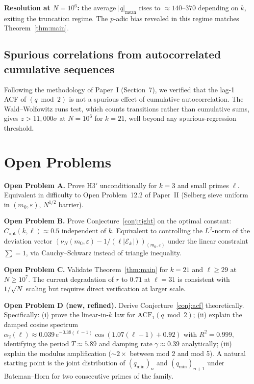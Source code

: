 \documentclass[11pt,a4paper]{article}
\theoremstyle{plain}
\theoremstyle{definition}
\newcommand{\qmin}{q_{\min}}
\newcommand{\eps}{\varepsilon}
\newcommand{\Eclass}{\mathcal{E}}
\begin{document}
\textbf{Resolution at $N = 10^6$:} the average $|q|_{\mathrm{mean}}$ rises to
$\approx 140$--$370$ depending on $k$, exiting the truncation regime. The
$p$-adic bias revealed in this regime matches Theorem~\ref{thm:main}.

\subsection{Spurious correlations from autocorrelated cumulative sequences}

Following the methodology of Paper~I (Section~7), we verified that the lag-1
ACF of $(q \bmod 2)$ is not a spurious effect of cumulative autocorrelation.
The Wald--Wolfowitz runs test, which counts transitions rather than cumulative
sums, gives $z > 11{,}000\sigma$ at $N = 10^6$ for $k = 21$, well beyond any
spurious-regression threshold.

\section{Open Problems}
\label{sec:openpb}

\begin{openproblem}
\textbf{Open Problem A.} Prove H3$'$ unconditionally for $k = 3$ and small primes
$\ell$. Equivalent in difficulty to Open Problem~12.2 of Paper~II
(Selberg sieve uniform in $(m_0, \eps)$, $N^{1/2}$ barrier).
\end{openproblem}

\begin{openproblem}
\textbf{Open Problem B.} Prove Conjecture~\ref{conj:tight} on the optimal
constant: $C_{\mathrm{opt}}(k, \ell) \approx 0.5$ independent of $k$. Equivalent
to controlling the $L^2$-norm of the deviation vector
$(\nu_N(m_0, \eps) - 1/(\ell |\Eclass_k|))_{(m_0, \eps)}$ under the linear
constraint $\sum = 1$, via Cauchy--Schwarz instead of triangle inequality.
\end{openproblem}

\begin{openproblem}
\textbf{Open Problem C.} Validate Theorem~\ref{thm:main} for $k = 21$ and
$\ell \ge 29$ at $N \ge 10^7$. The current degradation of $r$ to $0.71$ at
$\ell = 31$ is consistent with $1/\sqrt{N}$ scaling but requires direct
verification at larger scale.
\end{openproblem}

\begin{openproblem}
\textbf{Open Problem D (new, refined).} Derive Conjecture~\ref{conj:acf}
theoretically. Specifically: (i) prove the linear-in-$k$ law for
$\mathrm{ACF}_1(q \bmod 2)$; (ii) explain the damped cosine spectrum
$\alpha_2(\ell) \approx 0.039\,e^{-0.39(\ell-1)}\cos(1.07(\ell-1) + 0.92)$
with $R^2 = 0.999$, identifying the period $T \approx 5.89$ and damping rate
$\gamma \approx 0.39$ analytically; (iii) explain the modulus amplification
($\sim 2\times$ between mod 2 and mod 5). A natural starting point is the joint
distribution of $(\qmin)_n$ and $(\qmin)_{n+1}$ under Bateman--Horn for two
consecutive primes of the family.
\end{openproblem}
\end{document}
